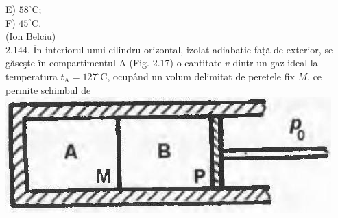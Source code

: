 \documentclass[10pt]{article}
\begin{document}
E) $58^{\circ} \mathrm{C}$;\\
F) $45^{\circ} \mathrm{C}$.\\
(Ion Belciu)\\
2.144. În interiorul unui cilindru orizontal, izolat adiabatic față de exterior, se găseşte în compartimentul A (Fig. 2.17) o cantitate $v$ dintr-un gaz ideal la temperatura $t_{\mathrm{A}}=127^{\circ} \mathrm{C}$, ocupând un volum delimitat de peretele fix $M$, ce permite schimbul de\\
\includegraphics[max width=\textwidth, center]{2025_07_01_5b3ff9fa0d508c8e9f17g-105}
\end{document}

